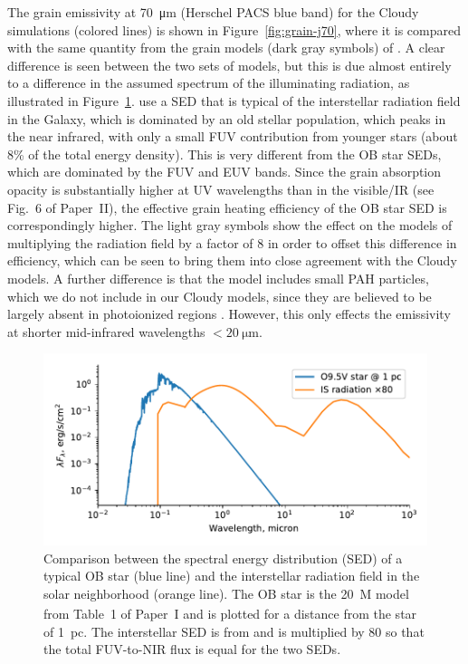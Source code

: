 The grain emissivity at \SI{70}{\um} (Herschel PACS blue band) for the
Cloudy simulations (colored lines) is shown in
Figure~\ref{fig:grain-j70}, where it is compared with the same
quantity from the grain models (dark gray symbols) of
\citet{Draine:2007a}.  A clear difference is seen between the two sets
of models, but this is due almost entirely to a difference in the
assumed spectrum of the illuminating radiation, as illustrated in
Figure~\ref{fig:sed-comparison}.  \citet{Draine:2007a} use a SED that
is typical of the interstellar radiation field in the Galaxy, which is
dominated by an old stellar population, which peaks in the near
infrared, with only a small FUV contribution from younger stars (about
8\% of the total energy density).  This is very different from the OB
star SEDs, which are dominated by the FUV and EUV bands.  Since the
grain absorption opacity is substantially higher at UV wavelengths
than in the visible/IR (see Fig.~6 of Paper~II),
the effective grain heating efficiency of the OB star SED is
correspondingly higher.  The light gray symbols show the effect on the
\citet{Draine:2007a} models of multiplying the radiation field by a
factor of \num{8} in order to offset this difference in efficiency,
which can be seen to bring them into close agreement with the Cloudy
models.  A further difference is that the \citet{Draine:2007a} model
includes small PAH particles, which we do not include in our Cloudy
models, since they are believed to be largely absent in photoionized
regions \citep{Giard:1994a, Lebouteiller:2011a}.  However, this only
effects the emissivity at shorter mid-infrared wavelengths
\(< \SI{20}{\um}\).

\begin{figure}
  \centering
  \includegraphics[width=\linewidth]{figs/sed-comparison}
  \caption{Comparison between the spectral energy distribution (SED)
    of a typical OB star (blue line) and the interstellar radiation
    field in the solar neighborhood (orange line).  The OB star is the
    \SI{20}{M_\odot} model from Table~1 of Paper~I and is plotted for
    a distance from the star of \SI{1}{pc}.  The interstellar SED is
    from \citet{Mathis:1983a} and is multiplied by \num{80} so that
    the total FUV-to-NIR flux is equal for the two SEDs.}
  \label{fig:sed-comparison}
\end{figure}

